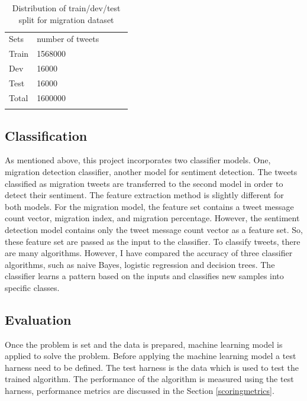 \begin{table}[]
\centering
\begin{tabular}{lllll}
\cline{1-2}
\multicolumn{1}{|l|}{Sets}   & \multicolumn{1}{l|}{number of tweets} &  &  &  \\ \cline{1-2}
\multicolumn{1}{|l|}{Train} & \multicolumn{1}{l|}{1568000}  &  &  &  \\ \cline{1-2}
\multicolumn{1}{|l|}{Dev} & \multicolumn{1}{l|}{16000 }  &  &  &  \\ \cline{1-2}
\multicolumn{1}{|l|}{Test} & \multicolumn{1}{l|}{16000 }  &  &  &  \\ \cline{1-2}
\multicolumn{1}{|l|}{Total}   & \multicolumn{1}{l|}{1600000}  &  &  &  \\ \cline{1-2}
                            &                           &  &  & 
\label{tab:Distribution of sentiment class}
\end{tabular}
\caption{Distribution of train/dev/test split for migration dataset}
\label{tab:Distsentimentdatset}
\end{table}


\subsection{Classification}
As mentioned above, this project incorporates two classifier models. One, migration detection classifier, another model for sentiment detection. The tweets classified as migration tweets are transferred to the second model in order to detect their sentiment. The feature extraction method is slightly different for both models. For the migration model, the feature set contains a tweet message count vector, migration index, and migration percentage. However, the sentiment detection model contains only the tweet message count vector as a feature set. So, these feature set are passed as the input to the classifier. To classify tweets, there are many algorithms. However, I have compared the accuracy of three classifier algorithms, such as naive Bayes, logistic regression and decision trees. The classifier learns a pattern based on the inputs and classifies new samples into specific classes.



\subsection{Evaluation} \label{eval}
Once the problem is set and the data is prepared, machine learning model is applied to solve the problem. Before applying the machine learning model a test harness need to be defined. The test harness is the data which is used to test the trained algorithm. The performance of the algorithm is measured using the test harness, performance metrics are discussed in the Section \ref{scoringmetrics}.

